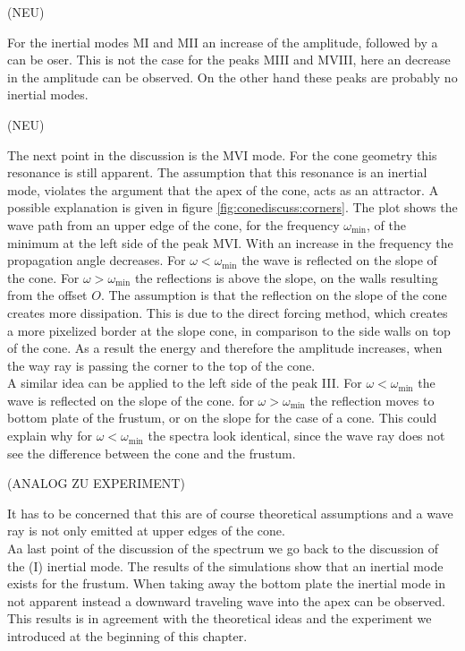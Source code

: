 (NEU)

For the inertial modes M\RN{1} and M\RN{2} an increase of the amplitude, followed by
a can be oser.
This is not the case for the peaks M\RN{3} and M\RN{8}, here an decrease in the amplitude
can be observed. On the other hand these peaks are probably no inertial modes.

(NEU)

The next point in the discussion is the M\RN{6} mode.
For the cone geometry this resonance is still apparent.
The assumption that this resonance is an inertial mode,
violates the argument that the apex of the cone, acts as
an attractor.
A possible explanation is given in figure \ref{fig:conediscuss:corners}.
The plot shows the wave path from an upper edge of the cone, for the frequency $\omega_{\text{min}}$,
of the minimum at the left side of the peak M\RN{6}.
With an increase in the frequency the propagation angle decreases.
For $\omega<\omega_{\text{min}}$ the wave is reflected on the slope of the cone.
For $\omega>\omega_{\text{min}}$ the reflections is above the slope, on the walls resulting from the offset $O$.
The assumption is that the reflection on the slope of the cone creates more dissipation.
This is due to the direct forcing method, which creates a more pixelized border at the slope cone,
in comparison to the side walls on top of the cone.
As a result the energy and therefore the amplitude increases,
when the way ray is passing the corner to the top of the cone.\\
A similar idea can be applied to the left side of the peak \RN{3}.
For $\omega<\omega_{\text{min}}$ the wave is reflected on the slope of the cone.
for  $\omega>\omega_{\text{min}}$ the reflection moves to bottom plate of the frustum,
or on the slope for the case of a cone.
This could explain why for $\omega<\omega_{\text{min}}$  the spectra look identical,
since the wave ray does not see the difference between the cone and the frustum.

(ANALOG ZU EXPERIMENT)


It has to be concerned that this are of course theoretical assumptions and a wave ray is not only emitted at
upper edges of the cone.\\
Aa last point of the discussion of the spectrum we go back to the discussion of the (\RN{1}) inertial mode.
The results of the simulations show that an inertial mode exists for the frustum.
When taking away the bottom plate the inertial mode in not apparent instead
a downward traveling wave into the apex can be observed.
This results is in agreement with the theoretical ideas and the experiment we introduced
at the beginning of this chapter.\\

